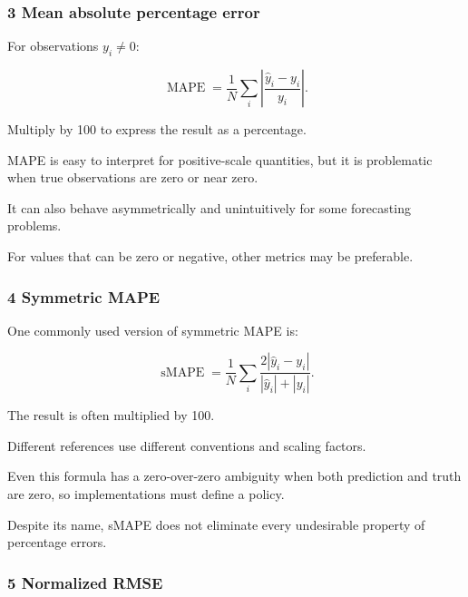 \subsubsection{3 Mean absolute percentage error}\label{02-foundations-ii-ch030-mean-absolute-percentage-error}

\hypertarget{02-foundations-ii-ch030-mean-absolute-percentage-error}{}

For observations \(y_i\ne0\):

\[
 \boxed{ \operatorname{MAPE} = \frac1N \sum_i \left| \frac{\hat y_i-y_i}{y_i} \right| }.
\]

Multiply by 100 to express the result as a percentage.

MAPE is easy to interpret for positive-scale quantities, but it is problematic when true observations are zero or near zero.

It can also behave asymmetrically and unintuitively for some forecasting problems.

For values that can be zero or negative, other metrics may be preferable.

\subsubsection{4 Symmetric MAPE}\label{02-foundations-ii-ch030-symmetric-mape}

\hypertarget{02-foundations-ii-ch030-symmetric-mape}{}

One commonly used version of symmetric MAPE is:

\[
 \boxed{ \operatorname{sMAPE} = \frac1N\sum_i \frac{2|\hat y_i-y_i|} {|\hat y_i|+|y_i|} }.
\]

The result is often multiplied by 100.

Different references use different conventions and scaling factors.

Even this formula has a zero-over-zero ambiguity when both prediction and truth are zero, so implementations must define a policy.

Despite its name, sMAPE does not eliminate every undesirable property of percentage errors.

\subsubsection{5 Normalized RMSE}\label{02-foundations-ii-ch030-normalized-rmse}

\hypertarget{02-foundations-ii-ch030-normalized-rmse}{}

